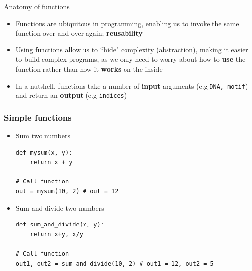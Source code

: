 \documentclass[pdf]{beamer}
\begin{document}
\begin{frame}{Anatomy of functions}

\begin{itemize}\addtolength{\itemsep}{0.5\baselineskip}
	\item<1-> Functions are ubiquitous in programming, enabling us to invoke the same
	function over and over again; \textbf{reusability}

	\item<2-> Using functions allow us to ``hide" complexity (abstraction), 
	making it easier to build complex programs, as we only need to 
	worry about how to \textbf{use} the function rather than how it \textbf{works}
	on the inside

	\item<3-> In a nutshell, functions take a number of \textbf{input} arguments
	(e.g \texttt{DNA, motif}) and return an \textbf{output} (e.g \texttt{indices})
\end{itemize}
\vfill
\begin{center}
\end{center}

\end{frame}

\begin{frame}[fragile]
\frametitle{Simple functions}

\begin{itemize}[leftmargin=*]
\item<1->Sum two numbers
\begin{lstlisting}[style=python]
def mysum(x, y):
    return x + y

# Call function
out = mysum(10, 2) # out = 12
\end{lstlisting}

\item<2->Sum and divide two numbers
\begin{lstlisting}[style=python]
def sum_and_divide(x, y):
    return x+y, x/y

# Call function
out1, out2 = sum_and_divide(10, 2) # out1 = 12, out2 = 5
\end{lstlisting}

\end{itemize}
\end{frame}
\end{document}
